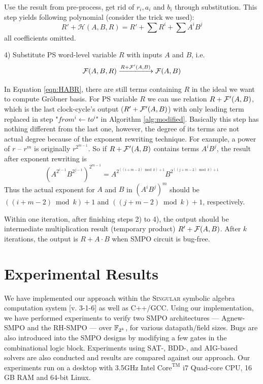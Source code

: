 Use the result from pre-process, get rid of $r_i, a_i$ and $b_i$ through substitution. This step yields following polynomial (consider the trick we used):
\begin{equation}
\label{eqn:HABR}
R'+ \mathcal{H}(A,B,R) = R' + \sum R^i + \sum A^iB^j
\end{equation}
all coefficients omitted.

4) Substitute PS word-level variable $R$ with inputs $A$ and $B$, i.e. 
$${\mathcal{F}}(A,B,R) \xrightarrow{R+{\mathcal{F}}'(A,B)} {\mathcal{F}}(A,B)$$

In Equation \ref{eqn:HABR}, there are still terms containing $R$ in the ideal we want to compute Gr\"obner basis.
For PS variable $R$ we can use relation $R+{\mathcal{F}}'(A,B)$, which is the last clock-cycle's output ($R'+{\mathcal{F}}'(A,B)$) 
with only leading term replaced in step "$from^i\gets to^i$" in 
Algorithm \ref{alg:modified}. Basically this step has nothing different from the last one, however, the degree
of its terms are not actual degree because of the exponent rewriting technique. For example,
a power of $r$ -- $r^m$ is originally $r^{2^{m-1}}$. So if $R+{\mathcal{F}}'(A,B)$ contains terms $A^iB^j$, the result 
after exponent rewriting
is $$(A^{2^{i-1}}B^{2^{j-1}})^{2^{m-1}} = A^{2^{((i+m-2)\bmod k)+1}}B^{2^{((j+m-2)\bmod k)+1}}$$
Thus the actual exponent for $A$ and $B$ in $(A^iB^j)^m$ should be $((i+m-2)\bmod k)+1$ and $((j+m-2)\bmod k)+1$, respectively.

Within one iteration, after finishing steps 2) to 4), the output should be intermediate multiplication result (temporary product) 
$R'+{\mathcal{F}}(A,B)$. After $k$ iterations,
the output is $R+A\cdot B$ when SMPO circuit is bug-free.


\section{Experimental Results}
\label{sec:result}

We have implemented our approach within the \textsc{Singular} symbolic
algebra computation system [v. 3-1-6] \cite{DGPS} as well as C++/GCC. Using our
implementation, we have performed experiments to verify two SMPO
architectures --- Agnew-SMPO \cite{agnew1991implementation} and the
RH-SMPO \cite{RHmulti} --- over ${\mathbb{F}}_{2^k}$, for various datapath/field
sizes. Bugs are also introduced into the SMPO designs by modifying a
few gates in the combinational logic block. Experiments using SAT-,
BDD-, and AIG-based solvers are also conducted and results are
compared against our approach.  Our experiments run on a desktop with
3.5GHz Intel $\text{Core}^\text{TM}$ i7 Quad-core CPU, 16 GB RAM and
64-bit Linux.   

